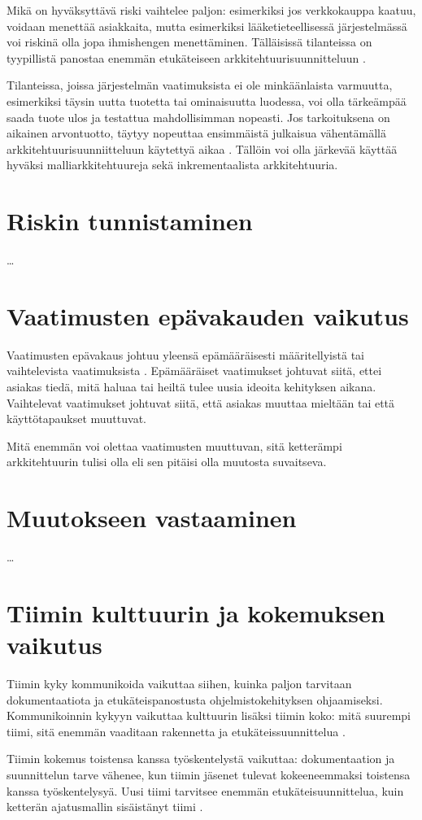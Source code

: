 Mikä on hyväksyttävä riski vaihtelee paljon: esimerkiksi jos verkkokauppa kaatuu, voidaan menettää asiakkaita, mutta esimerkiksi lääketieteellisessä järjestelmässä voi riskinä olla jopa ihmishengen menettäminen. Tälläisissä tilanteissa on tyypillistä panostaa enemmän etukäteiseen arkkitehtuurisuunnitteluun \citep{waterman_agility_2018_2}. 

Tilanteissa, joissa järjestelmän vaatimuksista ei ole minkäänlaista varmuutta, esimerkiksi täysin uutta tuotetta tai ominaisuutta luodessa, voi olla tärkeämpää saada tuote ulos ja testattua mahdollisimman nopeasti. Jos tarkoituksena on aikainen arvontuotto, täytyy nopeuttaa ensimmäistä julkaisua vähentämällä arkkitehtuurisuunniitteluun käytettyä aikaa \citep{waterman_how_2015}. Tällöin voi olla järkevää käyttää hyväksi malliarkkitehtuureja sekä inkrementaalista arkkitehtuuria.
\section{Riskin tunnistaminen}
\dots
\section{Vaatimusten epävakauden vaikutus}
Vaatimusten epävakaus johtuu yleensä epämääräisesti määritellyistä tai vaihtelevista vaatimuksista \citep{waterman_how_2015}. Epämääräiset vaatimukset johtuvat siitä, ettei asiakas tiedä, mitä haluaa tai heiltä tulee uusia ideoita kehityksen aikana. Vaihtelevat vaatimukset johtuvat siitä, että asiakas muuttaa mieltään tai että käyttötapaukset muuttuvat.

Mitä enemmän voi olettaa vaatimusten muuttuvan, sitä ketterämpi arkkitehtuurin tulisi olla eli sen pitäisi olla muutosta suvaitseva.
\section{Muutokseen vastaaminen}
\dots
\section{Tiimin kulttuurin ja kokemuksen vaikutus}
Tiimin kyky kommunikoida vaikuttaa siihen, kuinka paljon tarvitaan dokumentaatiota ja etukäteispanostusta ohjelmistokehityksen ohjaamiseksi. Kommunikoinnin kykyyn vaikuttaa kulttuurin lisäksi tiimin koko: mitä suurempi tiimi, sitä enemmän vaaditaan rakennetta ja etukäteissuunnittelua \citep{waterman_how_2015}.

Tiimin kokemus toistensa kanssa työskentelystä vaikuttaa: dokumentaation ja suunnittelun tarve vähenee, kun tiimin jäsenet tulevat kokeeneemmaksi toistensa kanssa työskentelysyä. Uusi tiimi tarvitsee enemmän etukäteisuunnittelua, kuin ketterän ajatusmallin sisäistänyt tiimi \citep{waterman_how_2015}.

